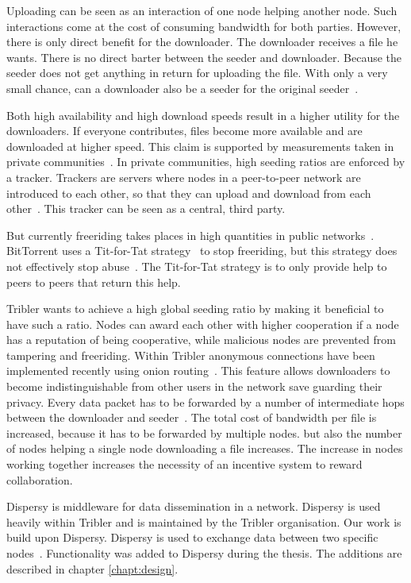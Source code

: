Uploading can be seen as an interaction of one node helping another node.
Such interactions come at the cost of consuming bandwidth for both parties.
However, there is only direct benefit for the downloader.
The downloader receives a file he wants.
There is no direct barter between the seeder and downloader.
Because the seeder does not get anything in return for uploading the file.
With only a very small chance, can a downloader also be a seeder for the original seeder~\cite{Lai-Incentives}.

Both high availability and high download speeds result in a higher utility for the downloaders.
If everyone contributes, files become more available and are downloaded at higher speed.
This claim is supported by measurements taken in private communities~\cite{meulpolder-privatecommunities}.
In private communities, high seeding ratios are enforced by a tracker.
Trackers are servers where nodes in a peer-to-peer network are introduced to each other,
so that they can upload and download from each other~\cite{cohen-titfortat}.
This tracker can be seen as a central, third party.

But currently freeriding takes places in high quantities in public networks~\cite{Adar-Freeriding}.
BitTorrent uses a Tit-for-Tat strategy~\cite{cohen-titfortat} to stop freeriding,
but this strategy does not effectively stop abuse~\cite{Pouwelse-tribler}.
The Tit-for-Tat strategy is to only provide help to peers to peers that return this help.

Tribler wants to achieve a high global seeding ratio by making it beneficial to have such a ratio.
Nodes can award each other with higher cooperation if a node has a reputation of being cooperative,
while malicious nodes are prevented from tampering and freeriding.
Within Tribler anonymous connections have been implemented recently using onion routing~\cite{Plak-anonymous,ruigrok-anonymous,tanaskoski-anonymous}.
This feature allows downloaders to become indistinguishable from other users in the network save guarding their privacy.
Every data packet has to be forwarded
by a number of intermediate hops between the downloader and seeder~\cite{Plak-anonymous,tanaskoski-anonymous}.
The total cost of bandwidth per file is increased,
because it has to be forwarded by multiple nodes.
but also the number of nodes helping a single node downloading a file increases.
The increase in nodes working together increases the necessity of an incentive system to reward collaboration.

Dispersy is middleware for data dissemination in a network.
Dispersy is used heavily within Tribler and is maintained by the Tribler organisation.
Our work is build upon Dispersy.
Dispersy is used to exchange data between two specific nodes~\cite{zeilemaker-dispersy}.
Functionality was added to Dispersy during the thesis.
The additions are described in chapter \ref{chapt:design}.

